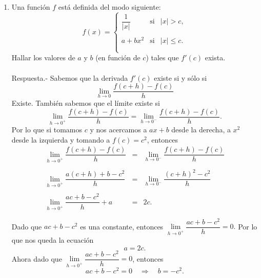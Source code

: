 \begin{enumerate}[\bfseries 1.]
    \item Una función $f$ está definida del modo siguiente:
    $$f(x)=\left\{\begin{array}{rcl}
	    \dfrac{1}{|x|}&\mbox{si}&|x|>c,\\\\
	    a+bx^2 &\mbox{si}&|x|\leq c.\\\\
    \end{array}\right.$$
    Hallar los valores de $a$ y $b$ (en función de $c$) tales que $f'(c)$ exista.\\\\
	Respuesta.-\; Sabemos que la derivada $f'(c)$ existe si y sólo si
	$$\lim_{h\to 0}\dfrac{f(c+h)-f(c)}{h}$$
	Existe. También sabemos que el límite existe si
	$$\lim_{h\to 0^+}\dfrac{f(c+h)-f(c)}{h} = \lim_{h\to 0^-}\dfrac{f(c+h)-f(c)}{h}.$$
	Por lo que si tomamos $c$ y nos acercamos a $ax+b$ desde la derecha, a $x^2$ desde la izquierda y tomando a $f(c)=c^2$, entonces 
	$$\begin{array}{rcl}
	    \lim\limits_{h\to 0^+} \dfrac{f(c+h)-f(c)}{h} &=& \lim\limits_{h\to 0^-} \dfrac{f(c+h)-f(c)}{h} \\\\
	    \lim\limits_{h\to 0^+} \dfrac{a(c+h)+b-c^2}{h} &=& \lim\limits_{h\to 0^-} \dfrac{(c+h)^2-c^2}{h} \\\\
	    \lim\limits_{h\to 0^+} \dfrac{ac+b-c^2}{h} + a &=& 2c.\\\\
	\end{array}$$
	Dado que $ac+b-c^2$ es una constante, entonces $\lim\limits_{h\to 0^+}\dfrac{ac+b-c^2}{h} = 0.$ Por lo que nos queda la ecuación 
	$$a=2c.$$
	Ahora dado que $\lim\limits_{h\to 0^+}\dfrac{ac+b-c^2}{h} = 0$, entonces
	$$ac+b-c^2=0 \quad \Rightarrow \quad b=-c^2.$$\\


\end{enumerate}
